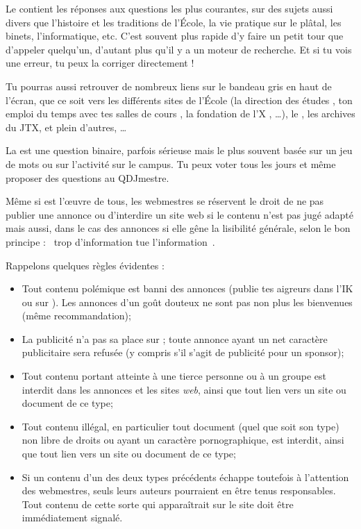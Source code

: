 Le  contient les r\'eponses aux questions les plus courantes, sur des sujets aussi divers que l'histoire et les traditions de l'\'Ecole, la
vie pratique sur le pl\^atal, les binets, l'informatique, etc. C'est souvent plus rapide d'y faire un petit tour que d'appeler quelqu'un, d'autant plus qu'il y a
un moteur de recherche. Et si tu vois une erreur, tu peux la corriger directement !

Tu pourras aussi retrouver de nombreux liens sur le bandeau gris en haut de l'écran, que ce soit vers les différents sites de l'\'Ecole (la direction des études , ton emploi du temps avec tes salles de cours , la fondation de l'X , \dots), le , les archives du JTX, et plein d'autres, \dots


La  est une question binaire, parfois s\'erieuse mais le
plus souvent bas\'ee sur un jeu de mots ou sur l'activit\'e sur le
campus. Tu peux voter tous les jours et m\^eme proposer des questions
au QDJmestre.

M\^eme si \fkz est l'\oe uvre de tous, les webmestres se r\'eservent le droit de ne pas publier une annonce ou d'interdire un site web si le contenu
n'est pas jug\'e adapt\'e mais aussi, dans le cas des annonces si elle g\^ene la lisibilit\'e g\'en\'erale, selon le bon principe : \guillemotleft~trop
d'information tue l'information~\guillemotright .

Rappelons quelques r\`egles \'evidentes :
\begin{itemize}
 \item Tout contenu pol\'emique est banni des annonces (publie tes aigreurs dans l'IK ou sur ).
       Les annonces d'un go\^ut douteux ne sont pas non plus les bienvenues (m\^eme recommandation);
 \item La publicit\'e n'a pas sa place sur \fkz ; toute annonce ayant un net caract\`ere publicitaire
       sera refus\'ee (y compris s'il s'agit de publicit\'e pour un sponsor);
 \item Tout contenu portant atteinte \`a  une tierce personne ou \`a  un groupe est interdit dans les annonces
       et les sites \emph{web}, ainsi que tout lien vers un site ou document de ce type;
 \item Tout contenu ill\'egal, en particulier tout document (quel que soit son type)
       non libre de droits ou ayant un caract\`ere pornographique, est interdit,
       ainsi que tout lien vers un site ou document de ce type;
 \item Si un contenu d'un des deux types pr\'ec\'edents \'echappe toutefois \`a  l'attention des webmestres,
       seuls leurs auteurs pourraient en \^etre tenus responsables.
       Tout contenu de cette sorte qui appara\^itrait sur le site doit \^etre imm\'ediatement signal\'e.
\end{itemize}


